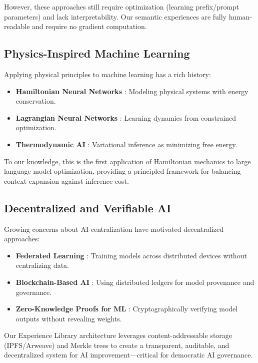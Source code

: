\documentclass[11pt,a4paper]{article}
\begin{document}
However, these approaches still require optimization (learning prefix/prompt parameters) and lack interpretability. Our semantic experiences are fully human-readable and require no gradient computation.

\subsection{Physics-Inspired Machine Learning}

Applying physical principles to machine learning has a rich history:
\begin{itemize}
    \item \textbf{Hamiltonian Neural Networks} \cite{greydanus2019hamiltonian}: Modeling physical systems with energy conservation.
    \item \textbf{Lagrangian Neural Networks} \cite{cranmer2020lagrangian}: Learning dynamics from constrained optimization.
    \item \textbf{Thermodynamic AI} \cite{opper2009variational}: Variational inference as minimizing free energy.
\end{itemize}

To our knowledge, this is the first application of Hamiltonian mechanics to large language model optimization, providing a principled framework for balancing context expansion against inference cost.

\subsection{Decentralized and Verifiable AI}

Growing concerns about AI centralization have motivated decentralized approaches:
\begin{itemize}
    \item \textbf{Federated Learning} \cite{mcmahan2017communication}: Training models across distributed devices without centralizing data.
    \item \textbf{Blockchain-Based AI} \cite{salah2019blockchain}: Using distributed ledgers for model provenance and governance.
    \item \textbf{Zero-Knowledge Proofs for ML} \cite{ghodsi2017safetynets}: Cryptographically verifying model outputs without revealing weights.
\end{itemize}

Our Experience Library architecture leverages content-addressable storage (IPFS/Arweave) and Merkle trees to create a transparent, auditable, and decentralized system for AI improvement—critical for democratic AI governance.
\end{document}
